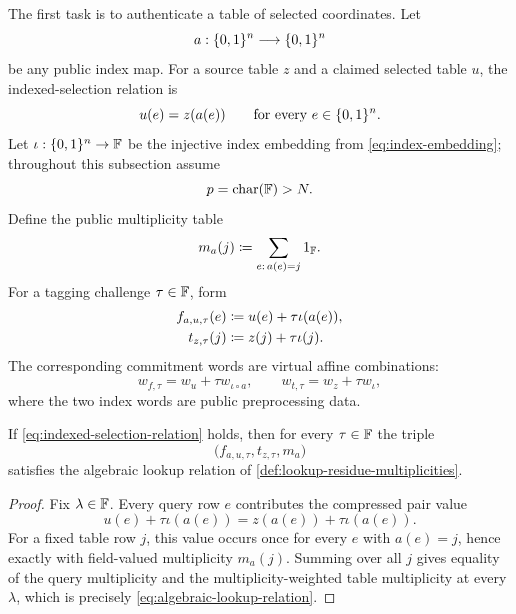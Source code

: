 The first task is to authenticate a table of selected coordinates.  Let
\begin{equation}
  a:\{0,1\}^n\longrightarrow\{0,1\}^n
  \label{eq:index-map-a}
\end{equation}
be any public index map.  For a source table $z$ and a claimed selected table $u$, the indexed-selection relation is
\begin{equation}
  u(e)=z(a(e))
  \qquad\text{for every }e\in\{0,1\}^n.
  \label{eq:indexed-selection-relation}
\end{equation}
Let $\iota:\{0,1\}^n\to\mathbb{F}$ be the injective index embedding from \eqref{eq:index-embedding}; throughout this subsection assume
\begin{equation}
  p=\operatorname{char}(\mathbb{F})>N.
  \label{eq:sparse-index-characteristic}
\end{equation}
Define the public multiplicity table
\begin{equation}
  m_a(j)
  \coloneqq
  \sum_{e:\,a(e)=j}1_{\mathbb{F}}.
  \label{eq:index-map-multiplicity}
\end{equation}
For a tagging challenge $\tau\in\mathbb{F}$, form
\begin{align}
  f_{a,u,\tau}(e)
  &\coloneqq u(e)+\tau\iota(a(e)),
  \label{eq:indexed-query-compression}\\
  t_{z,\tau}(j)
  &\coloneqq z(j)+\tau\iota(j).
  \label{eq:indexed-table-compression}
\end{align}
The corresponding commitment words are virtual affine combinations:
\begin{equation}
  w_{f,\tau}=w_u+\tau w_{\iota\circ a},
  \qquad
  w_{t,\tau}=w_z+\tau w_{\iota},
  \label{eq:indexed-virtual-compressions}
\end{equation}
where the two index words are public preprocessing data.

\begin{lemma}
\label{lem:indexed-selection-gives-lookup}
If \eqref{eq:indexed-selection-relation} holds, then for every $\tau\in\mathbb{F}$ the triple
\begin{equation}
  \bigl(f_{a,u,\tau},t_{z,\tau},m_a\bigr)
  \label{eq:indexed-selection-lookup-triple}
\end{equation}
satisfies the algebraic lookup relation of \cref{def:lookup-residue-multiplicities}.
\end{lemma}

\begin{proof}
Fix $\lambda\in\mathbb{F}$.  Every query row $e$ contributes the compressed pair value
\[
  u(e)+\tau\iota(a(e))
  =z(a(e))+\tau\iota(a(e)).
\]
For a fixed table row $j$, this value occurs once for every $e$ with $a(e)=j$, hence exactly with field-valued multiplicity $m_a(j)$.  Summing over all $j$ gives equality of the query multiplicity and the multiplicity-weighted table multiplicity at every $\lambda$, which is precisely \eqref{eq:algebraic-lookup-relation}.
\end{proof}


